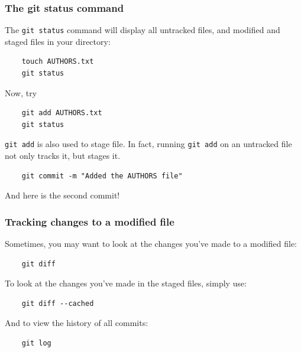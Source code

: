 %
%
\begin{frame}[fragile]
  \frametitle{
    The git status command
  }

  The {\tt git status} command will display all untracked files, and modified and staged files in your directory:

  \begin{lstlisting}
    touch AUTHORS.txt
    git status
  \end{lstlisting}

  Now, try
  \begin{lstlisting}
    git add AUTHORS.txt
    git status
  \end{lstlisting}

  {\tt git add} is also used to stage file. In fact, running {\tt git add} on an untracked file not only tracks it, but stages it.

  \begin{lstlisting}
    git commit -m "Added the AUTHORS file"
  \end{lstlisting}

  And here is the second commit! 

\end{frame}
%
%
\begin{frame}[fragile]
  \frametitle{
    Tracking changes to a modified file
  }

  Sometimes, you may want to look at the changes you've made to a modified file:

  \begin{lstlisting}
    git diff
  \end{lstlisting}

  To look at the changes you've made in the staged files, simply use:

  \begin{lstlisting}
    git diff --cached
  \end{lstlisting}

  And to view the history of all commits:

  \begin{lstlisting}
    git log
  \end{lstlisting}

\end{frame}


